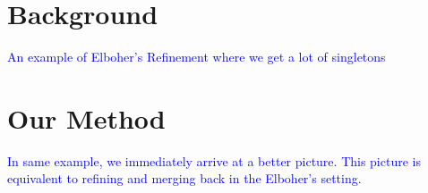 \documentclass[sigplan,screen,natbib=false]{acmart}
\newcommand{\dmcmt}[1]{\textcolor{blue}{#1}}
\begin{document}
\section{Background}

\dmcmt{ 
    An example of Elboher's Refinement where we get a lot of singletons
}

\section{Our Method}

\dmcmt{
    In same example, we immediately arrive at a better picture. 
    This picture is equivalent to refining and merging back in the Elboher's
    setting.
} 

%
%
%
%
%
%
%
\end{document}
